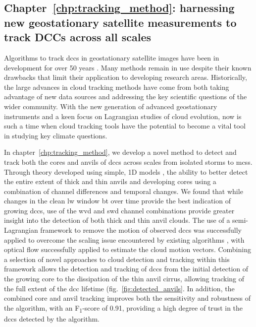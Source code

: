 \subsection{Chapter~\ref{chp:tracking_method}: harnessing new geostationary satellite measurements to track DCCs across all scales}

Algorithms to track \acrshort{dcc}s in geostationary satellite images have been in development for over 50 years \citep{menzel_cloud_2001}.
Many methods remain in use despite their known drawbacks \citep{augustine_mesoscale_1988} that limit their application to developing research areas.
Historically, the large advances in cloud tracking methods have come from both taking advantage of new data sources and addressing the key scientific questions of the wider community.
With the new generation of advanced geostationary instruments and a keen focus on Lagrangian studies of cloud evolution, now is such a time when cloud tracking tools have the potential to become a vital tool in studying key climate questions.

In chapter~\ref{chp:tracking_method}, we develop a novel method to detect and track both the cores and anvils of \acrshort{dcc}s across scales from isolated storms to \acrshort{mcs}s.
Through theory developed using simple, 1D models \citep{emde_libradtran_2016}, the ability to better detect the entire extent of thick and thin anvils and developing cores using a combination of channel differences and temporal changes.
We found that while changes in the clean \acrshort{lw} window \acrshort{bt} over time provide the best indication of growing \acrshort{dcc}s, use of the \acrshort{wvd} and \acrshort{swd} channel combinations provide greater insight into the detection of both thick and thin anvil clouds.
The use of a semi-Lagrangian framework to remove the motion of observed \acrshort{dcc}s was successfully applied to overcome the scaling issue encountered by existing algorithms \citep{lakshmanan_objective_2009}, with optical flow successfully applied to estimate the cloud motion vectors.
Combining a selection of novel approaches to cloud detection and tracking \citep{muller_novel_2019, fiolleau_algorithm_2013, zinner_cb-tram_2008} within this framework allows the detection and tracking of \acrshort{dcc}s from the initial detection of the growing core to the dissipation of the thin anvil cirrus, allowing tracking of the full extent of the \acrshort{dcc} lifetime (fig.~\ref{fig:detected_anvils}.
In addition, the combined core and anvil tracking improves both the sensitivity and robustness of the algorithm, with an F\textsubscript{1}-score of 0.91, providing a high degree of trust in the \acrshort{dcc}s detected by the algorithm.

